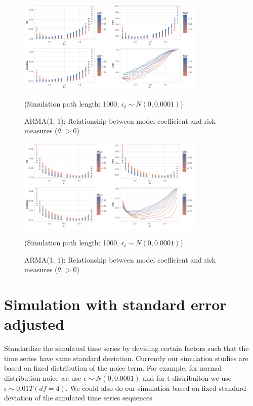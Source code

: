 \documentclass[11pt]{article}
\begin{document}
\begin{figure}[H]
\centering
\includegraphics[width = 0.8\textwidth]{../figures/simulation/AR1MA1_risk_measures_pos_coef}
\caption{ARMA(1, 1): Relationship between model coefficient and risk measures ($\theta_1>0$)}
(Simulation path length: 1000, $\epsilon_t \sim N(0, 0.0001)$)
\label{fig:AR1MA1_risk_measures_pos_coef}
\end{figure}

\begin{figure}[H]
\centering
\includegraphics[width = 0.8\textwidth]{../figures/simulation/AR1MA1_risk_measures_neg_coef}
\caption{ARMA(1, 1): Relationship between model coefficient and risk measures ($\theta_1>0$)}
(Simulation path length: 1000, $\epsilon_t \sim N(0, 0.0001)$)
\label{fig:AR1MA1_risk_measures_neg_coef}
\end{figure}

\section{Simulation with standard error adjusted} %

Standardize the simulated time series by deviding certain factors such that the time series have same standard deviation. Currently our simulation studies are based on fixed distribution of the noice term. For example, for normal distribution noice we use $\epsilon \sim N(0, 0.0001)$ and for t-distribuiton we use $\epsilon \sim 0.01T(df =4)$. We could also do our simulation based on fixed standard deviation of the simulated time series sequences.
\end{document}
